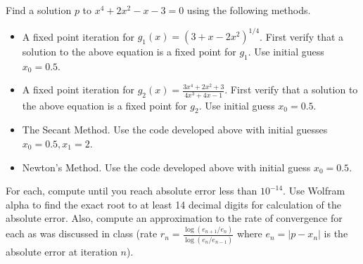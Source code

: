 \documentclass[addpoints, 11pt]{exam}
\begin{document}
\begin{questions}

\question Find a solution $p$ to $x^4+2x^2-x-3=0$ using the following methods.
\begin{itemize}
\item A fixed point iteration for $g_1(x) = (3+x-2x^2)^{1/4}$. First verify that a solution to the above equation is a fixed point for $g_1$. Use initial guess $x_0=0.5$.
\item A fixed point iteration for $g_2(x) = \frac{3x^4+2x^2+3}{4x^3+4x-1}$.  First verify that a solution to the above equation is a fixed point for $g_2$. Use initial guess $x_0=0.5$.
\item The Secant Method. Use the code developed above with initial guesses $x_0=0.5, x_1=2$.
\item Newton's Method. Use the code developed above with initial guess $x_0=0.5$.
\end{itemize}
For each, compute until you reach absolute error less than $10^{-14}$. Use Wolfram alpha to find the exact root to at least 14 decimal digits for calculation of the absolute error. Also, compute an approximation to the rate of convergence for each as was discussed in class (rate $r_n = \frac{\log(e_{n+1}/e_n)}{\log(e_n/e_{n-1})}$ where $e_n = |p-x_n|$ is the absolute error at iteration $n$). 
\end{questions}
\end{document}
